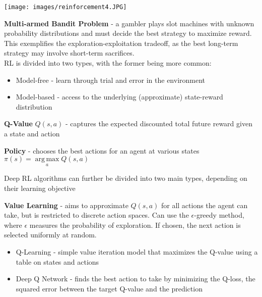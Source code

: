 \documentclass[10pt,landscape]{article}
\DeclareMathOperator*{\argmax}{arg\,max}
\begin{document}
\begin{multicols}{3}
\begin{center}
\vspace{-2mm}
    \texttt{[image: images/reinforcement4.JPG]}
\end{center}
\vspace{-2.5mm}
\textbf{Multi-armed Bandit Problem} - a gambler plays slot machines with unknown probability distributions and must decide the best strategy to maximize reward. This exemplifies the exploration-exploitation tradeoff, as the best long-term strategy may involve short-term sacrifices.\\
\smallskip
RL is divided into two types, with the former being more common:
\begin{itemize}[label={--},leftmargin=4mm]
\itemsep -.4mm
\item Model-free - learn through trial and error in the environment
\item Model-based - access to the underlying (approximate) state-reward distribution
\end{itemize}

\textbf{Q-Value} $Q(s,a)$ - captures the expected discounted total future reward given a state and action

\textbf{Policy} - chooses the best actions for an agent at various states \\
$ \pi(s) = \argmax\limits_a Q(s,a)$\\
\smallskip

Deep RL algorithms can further be divided into two main types, depending on their learning objective

\textbf{Value Learning} - aims to approximate $Q(s,a)$ for all actions the agent can take, but is restricted to discrete action spaces. Can use the $\epsilon$-greedy method, where $\epsilon$ measures the probability of exploration. If chosen, the next action is selected uniformly at random.
\begin{itemize}[label={--},leftmargin=4mm]
\itemsep -.4mm
\item Q-Learning - simple value iteration model that maximizes the Q-value using a table on states and actions
\item Deep Q Network - finds the best action to take by minimizing the Q-loss, the squared error between the target Q-value and the prediction
\end{itemize}


\end{multicols}
\end{document}
